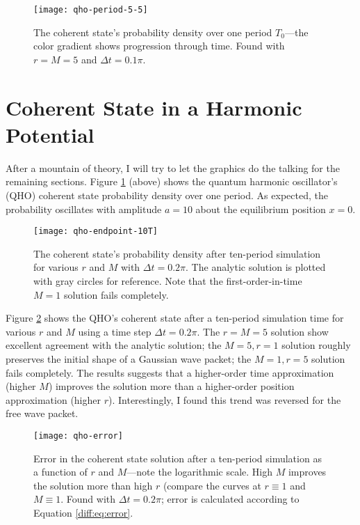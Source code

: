 \documentclass[11pt, a4paper]{article}
\begin{document}
\begin{figure}[b!]
\centering
\texttt{[image: qho-period-5-5]}
\caption{The coherent state's probability density over one period $ T_{0} $---the color gradient shows progression through time. Found with $ r = M = 5 $ and $ \Delta t = 0.1 \pi $.}
\label{diff:fig:qho-period}
\end{figure}

\section{Coherent State in a Harmonic Potential}  \label{diff:s:coherent}
After a mountain of theory, I will try to let the graphics do the talking for the remaining sections. Figure \ref{diff:fig:qho-period} (above) shows the quantum harmonic oscillator's (QHO) coherent state probability density over one period. As expected, the probability oscillates with amplitude $ a = 10 $ about the equilibrium position $ x = 0 $. 

\begin{figure}[htb!]
\centering
\texttt{[image: qho-endpoint-10T]}
\caption{The coherent state's probability density after ten-period simulation for various $ r $ and $ M $ with $ \Delta t = 0.2 \pi $. The analytic solution is plotted with gray circles for reference. Note that the first-order-in-time $ M=1 $ solution fails completely.}
\label{diff:fig:qho-endpoint}
\end{figure}

Figure \ref{diff:fig:qho-endpoint} shows the QHO's coherent state after a ten-period simulation time for various $ r $ and $ M $ using a time step $ \Delta t = 0.2 \pi $. The $ r = M = 5 $ solution show excellent agreement with the analytic solution; the $ M = 5, r = 1 $ solution roughly preserves the initial shape of a Gaussian wave packet; the $ M = 1, r = 5 $ solution fails completely. The results suggests that a higher-order time approximation (higher $ M $) improves the solution more than a higher-order position approximation (higher $ r $). Interestingly, I found this trend was reversed for the free wave packet.


\begin{figure}[htb!]
\centering
\texttt{[image: qho-error]}
\caption{Error in the coherent state solution after a ten-period simulation as a function of $ r $ and $ M $---note the logarithmic scale. High $ M $ improves the solution more than high $ r $ (compare the curves at $ r \equiv 1$ and $ M \equiv 1 $. Found with $ \Delta t = 0.2\pi $; error is calculated according to Equation \ref{diff:eq:error}.}
\label{diff:fig:qho-error}
\end{figure}
\end{document}
